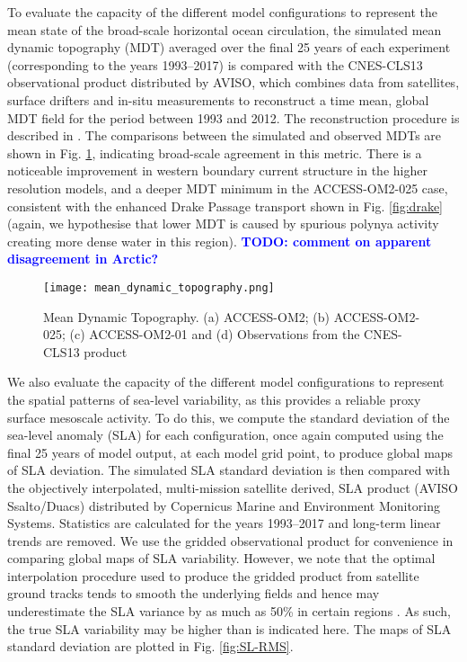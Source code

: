 \documentclass[gmd, manuscript]{copernicus}
\newcommand{\TODO}[1]{\textcolor{blue}{\textsf{\textbf{TODO: #1}}}}
\begin{document}
To evaluate the capacity of the different model configurations to represent the mean state of the broad-scale horizontal ocean circulation, the simulated mean dynamic topography (MDT) averaged over the final 25 years of each experiment (corresponding to the years 1993--2017) is compared with the CNES-CLS13 observational product distributed by AVISO, which combines data from satellites, surface drifters and in-situ measurements to reconstruct a time mean, global MDT field for the period between 1993 and 2012. 
The reconstruction procedure is described in \citet{Rio2011}. 
The comparisons between the simulated and observed MDTs are shown in Fig. \ref{fig:mdt}, indicating broad-scale agreement in this metric.
There is a noticeable improvement in western boundary current structure in the higher resolution models, and a deeper MDT minimum in the ACCESS-OM2-025 case, consistent with the enhanced Drake Passage transport shown in Fig. \ref{fig:drake} (again, we hypothesise that lower MDT is caused by spurious polynya activity creating more dense water in this region).
\TODO{comment on apparent disagreement in Arctic?}

\begin{figure}[t]
\texttt{[image: mean\_dynamic\_topography.png]}
\caption{Mean Dynamic Topography. (a) ACCESS-OM2; (b) ACCESS-OM2-025; (c) ACCESS-OM2-01 and (d) Observations from the CNES-CLS13 product
\label{fig:mdt}}
\end{figure}

We also evaluate the capacity of the different model configurations to represent the spatial patterns of sea-level variability, as this provides a reliable proxy surface mesoscale activity. 
To do this, we compute the standard deviation of the sea-level anomaly (SLA) for each configuration, once again computed using the final 25 years of model output, at each model grid point, to produce global maps of SLA deviation. 
The simulated SLA standard deviation is then compared with the objectively interpolated, multi-mission satellite derived, SLA product (AVISO Ssalto/Duacs) distributed by Copernicus Marine and Environment Monitoring Systems. 
Statistics are calculated for the years 1993--2017 and long-term linear trends are removed. 
We use the gridded observational product for convenience in comparing global maps of SLA variability. 
However, we note that the optimal interpolation procedure used to produce the gridded product from satellite ground tracks tends to smooth the underlying fields and hence may underestimate the SLA variance by as much as 50\% in certain regions \citep{Chambers2018}. 
As such, the true SLA variability may be higher than is indicated here. 
The maps of SLA standard deviation are plotted in Fig. \ref{fig:SL-RMS}.   
\end{document}

